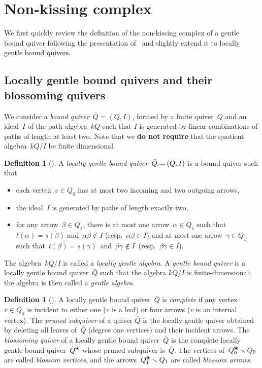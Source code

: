 \documentclass{amsart}
\theoremstyle{definition}
\newtheorem{definition}[theorem]{Definition}
\newcommand{\ssm}{\smallsetminus} %
\newcommand{\eqdef}{\mbox{\,\raisebox{0.2ex}{\scriptsize\ensuremath{\mathrm:}}\ensuremath{=}\,}} %
\newcommand{\darkblue}{\color{darkblue}} %
\newcommand{\defn}[1]{\textsl{\darkblue #1}} %
\newcommand{\blossom}{^\text{\ding{96}}} %
\begin{document}
\section{Non-kissing complex}\label{sec:nonKissingComplex}

We first quickly review the definition of the non-kissing complex of a gentle bound quiver following the presentation of~\cite{PaluPilaudPlamondon} and slightly extend it to locally gentle bound quivers.

\subsection{Locally gentle bound quivers and their blossoming quivers}

We consider a \defn{bound quiver}~$\bar Q = (Q,I)$, formed by a finite quiver~$Q$ and an ideal~$I$ of the path algebra~$kQ$ such that $I$ is generated by linear combinations of paths of length at least two.
Note that we \textbf{do not require} that the quotient algebra~$kQ/I$ be finite dimensional.

\begin{definition}[\cite{ButlerRingel}]
\label{def:gentleQuiver}
A \defn{locally gentle bound quiver}~$\bar Q \eqdef (Q,I)$ is a bound quiver such that
\begin{itemize}
\item each vertex~$v \in Q_0$ has at most two incoming and two outgoing arrows,
\item the ideal~$I$ is generated by paths of length exactly two,
\item for any arrow~$\beta \in Q_1$, there is at most one arrow~$\alpha \in Q_1$ such that~$t(\alpha) = s(\beta)$ and~${\alpha\beta\notin I}$ (resp.~$\alpha\beta \in I$) and at most one arrow~$\gamma \in Q_1$ such that~$t(\beta) = s(\gamma)$~and~${\beta\gamma\notin I}$~(resp.~${\beta\gamma \in I}$).
\end{itemize}
The algebra~$kQ/I$ is called a \defn{locally gentle algebra}.
A \defn{gentle bound quiver} is a locally gentle bound quiver~$\bar Q$ such that the algebra $kQ/I$ is finite-dimensional; the algebra is then called a \defn{gentle algebra}.
\end{definition}

\begin{definition}[\cite{PaluPilaudPlamondon}]
\label{def:blossomingQuiver}
A locally gentle bound quiver~$\bar Q$ is \defn{complete} if any vertex~$v \in Q_0$ is incident to either one ($v$ is a leaf) or four arrows ($v$ is an internal vertex).
The \defn{pruned subquiver} of a quiver $\bar Q$ is the locally gentle quiver obtained by deleting all leaves of~$\bar Q$ (degree one vertices) and their incident arrows.
The \defn{blossoming quiver} of a locally gentle bound quiver~$\bar Q$ is the complete locally gentle bound quiver~$\bar Q\blossom$ whose pruned subquiver is~$\bar Q$.
The vertices of~$Q\blossom_0 \ssm Q_0$ are called \defn{blossom vertices}, and the arrows~$Q\blossom_1 \ssm Q_1$ are called \defn{blossom arrows}.
\end{definition}
\end{document}
